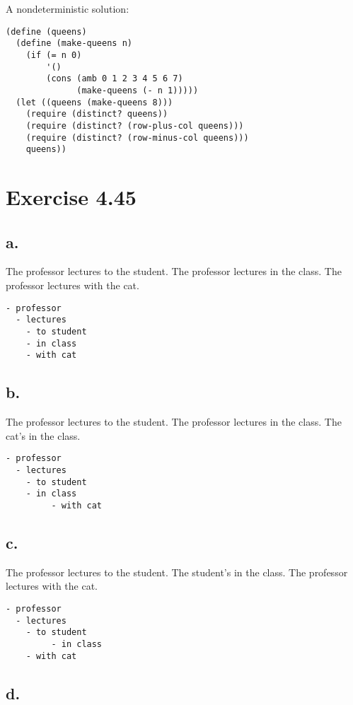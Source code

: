 \documentclass[../main.tex]{subfiles}
\begin{document}
A nondeterministic solution:

\begin{lstlisting}
(define (queens)
  (define (make-queens n)
    (if (= n 0)
        '()
        (cons (amb 0 1 2 3 4 5 6 7)
              (make-queens (- n 1)))))
  (let ((queens (make-queens 8)))
    (require (distinct? queens))
    (require (distinct? (row-plus-col queens)))
    (require (distinct? (row-minus-col queens)))
    queens))
\end{lstlisting}

\section{Exercise 4.45}

\subsection{a.}

The professor lectures to the student.
The professor lectures in the class.
The professor lectures with the cat.

\begin{lstlisting}
- professor
  - lectures
    - to student
    - in class
    - with cat
\end{lstlisting}

\subsection{b.}

The professor lectures to the student.
The professor lectures in the class.
The cat's in the class.

\begin{lstlisting}
- professor
  - lectures
    - to student
    - in class
         - with cat
\end{lstlisting}

\subsection{c.}

The professor lectures to the student.
The student's in the class.
The professor lectures with the cat.

\begin{lstlisting}
- professor
  - lectures
    - to student
         - in class
    - with cat
\end{lstlisting}

\subsection{d.}
\end{document}
